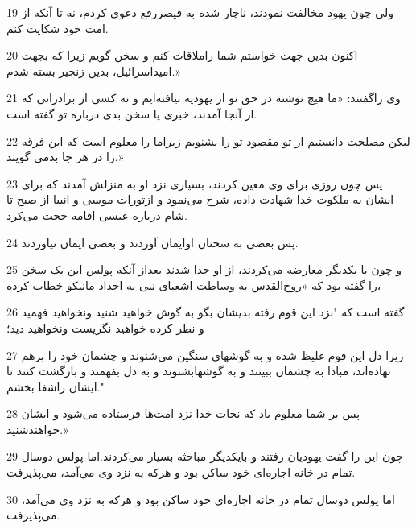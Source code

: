 \par 19 ولی چون یهود مخالفت نمودند، ناچار شده به قیصررفع دعوی کردم، نه تا آنکه از امت خود شکایت کنم.
\par 20 اکنون بدین جهت خواستم شما راملاقات کنم و سخن گویم زیرا که بجهت امیداسرائیل، بدین زنجیر بسته شدم.»
\par 21 وی راگفتند: «ما هیچ نوشته در حق تو از یهودیه نیافته‌ایم و نه کسی از برادرانی که از آنجا آمدند، خبری یا سخن بدی درباره تو گفته است.
\par 22 لیکن مصلحت دانستیم از تو مقصود تو را بشنویم زیراما را معلوم است که این فرقه را در هر جا بدمی گویند.»
\par 23 پس چون روزی برای وی معین کردند، بسیاری نزد او به منزلش آمدند که برای ایشان به ملکوت خدا شهادت داده، شرح می‌نمود و ازتورات موسی و انبیا از صبح تا شام درباره عیسی اقامه حجت می‌کرد.
\par 24 پس بعضی به سخنان اوایمان آوردند و بعضی ایمان نیاوردند.
\par 25 و چون با یکدیگر معارضه می‌کردند، از او جدا شدند بعداز آنکه پولس این یک سخن را گفته بود که «روح‌القدس به وساطت اشعیای نبی به اجداد مانیکو خطاب کرده،
\par 26 گفته است که "نزد این قوم رفته بدیشان بگو به گوش خواهید شنید ونخواهید فهمید و نظر کرده خواهید نگریست ونخواهید دید؛
\par 27 زیرا دل این قوم غلیظ شده و به گوشهای سنگین می‌شنوند و چشمان خود را برهم نهاده‌اند، مبادا به چشمان ببینند و به گوشهابشنوند و به دل بفهمند و بازگشت کنند تا ایشان راشفا بخشم."
\par 28 پس بر شما معلوم باد که نجات خدا نزد امت‌ها فرستاده می‌شود و ایشان خواهندشنید.»
\par 29 چون این را گفت یهودیان رفتند و بایکدیگر مباحثه بسیار می‌کردند.اما پولس دوسال تمام در خانه اجاره‌ای خود ساکن بود و هرکه به نزد وی می‌آمد، می‌پذیرفت.
\par 30 اما پولس دوسال تمام در خانه اجاره‌ای خود ساکن بود و هرکه به نزد وی می‌آمد، می‌پذیرفت.



